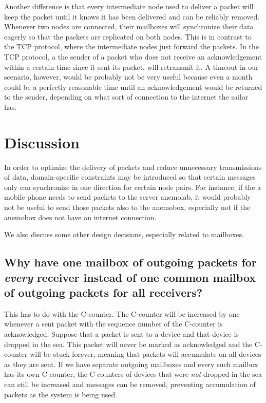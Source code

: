 \documentclass{article}
\begin{document}
Another difference is that every intermediate node used to deliver a packet will keep the packet until it knows it has been delivered and can be reliably removed. Whenever two nodes are connected, their mailboxes will synchronize their data eagerly so that the packets are replicated on both nodes. This is in contrast to the TCP protocol, where the intermediate nodes just forward the packets. In the TCP protocol, a the sender of a packet who does not receive an acknowledgement within a certain time since it sent its packet, will retransmit it. A timeout in our scenario, however, would be probably not be very useful because even a month could be a perfectly reasonable time until an acknowledgement would be returned to the sender, depending on what sort of connection to the internet the sailor has.

\section{Discussion}
In order to optimize the delivery of packets and reduce unnecessary transmissions of data, domain-specific constraints may be introduced so that certain messages only can synchronize in one direction for certain node pairs. For instance, if the a mobile phone needs to send packets to the server anemolab, it would probably not be useful to send those packets also to the anemobox, especially not if the anemobox does not have an internet connection.

We also discuss some other design decisions, especially related to mailboxes.

\subsection{Why have one mailbox of outgoing packets for \emph{every} receiver instead of one common mailbox of outgoing packets for all receivers?}
This has to do with the C-counter. The C-counter will be increased by one whenever a sent packet with the sequence number of the C-counter is acknowledged. Suppose that a packet is sent to a device and that device is dropped in the sea. This packet will never be marked as acknowledged and the C-counter will be stuck forever, meaning that packets will accumulate on all devices as they are sent. If we have separate outgoing mailboxes and every such mailbox has its own C-counter, the C-counters of devices that were \emph{not} dropped in the sea can still be increased and messages can be removed, preventing accumulation of packets as the system is being used.
\end{document}
